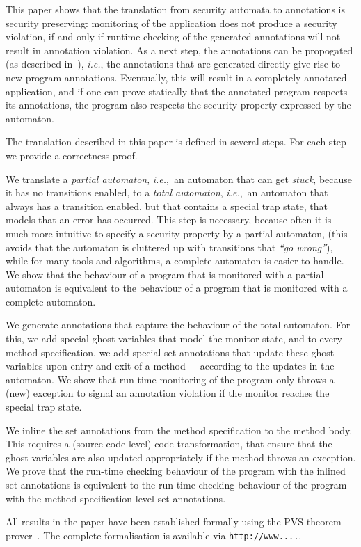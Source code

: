 This paper shows that the translation from security automata to
annotations is security preserving: monitoring of the application does
not produce a security violation, if and only if runtime checking of
the generated annotations will not result in annotation violation. As
a next step, the annotations can be propogated (as described
in~\cite{PavlovaBBHL04}), \emph{i.e.}, the annotations that are
generated directly give rise to new program annotations. Eventually,
this will result in a completely annotated application, and if one can
prove statically that the annotated program respects its annotations,
the program also respects the security property expressed by the automaton.

The translation described in this paper is defined in several
steps. For each step we provide a correctness proof.
\begin{inparaenum}
\item We translate a \emph{partial automaton},
\emph{i.e.},\ an automaton that can get \emph{stuck}, because it has
no transitions enabled, to a \emph{total automaton}, \emph{i.e.},\ an
automaton that always has a transition enabled, but that contains a
special trap state, that models that an error has occurred.
This step is necessary, because often it is much more intuitive to
specify a security property by a partial automaton, (this
avoids that the automaton is cluttered up with transitions that
\emph{``go wrong''}), while for many tools and algorithms, a complete
automaton is easier to handle. We show that the behaviour of a program
that is monitored with a partial automaton is equivalent to the
behaviour of a program that is monitored with a complete
automaton. 
\item We generate annotations that capture the behaviour of the total automaton. For this, we add special ghost variables that model the
monitor state, and to every method specification, we add special
\textsf{set} annotations that update these ghost variables upon entry
and exit of a method~--~according to the updates in the automaton. 
We show that run-time monitoring of the program
only throws a (new) exception to signal an annotation violation if the
monitor reaches the special trap state. 
\item We inline the
\textsf{set} annotations from the method specification to the method
body. This requires a (source code level) code transformation, that
ensure that the ghost variables are also updated appropriately if the
method throws an exception. We prove that the run-time checking
behaviour of the program with the inlined \textsf{set} annotations is
equivalent to the run-time checking behaviour of the program with the
method specification-level \textsf{set} annotations. 
\end{inparaenum}
All results in the paper have been established formally using
the PVS theorem prover~\cite{OwreRRSS96}. The complete formalisation
is available via
\texttt{http://www....}. 

